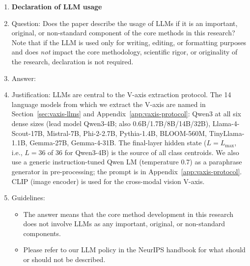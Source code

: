 \begin{enumerate}
\item {\bf Declaration of LLM usage}
    \item[] Question: Does the paper describe the usage of LLMs if it is an important, original, or non-standard component of the core methods in this research? Note that if the LLM is used only for writing, editing, or formatting purposes and does \emph{not} impact the core methodology, scientific rigor, or originality of the research, declaration is not required.
    \item[] Answer: \answerYes{}
    \item[] Justification: LLMs are central to the V-axis extraction protocol. The 14 language models from which we extract the V-axis are named in Section~\ref{sec:vaxis-llms} and Appendix~\ref{app:vaxis-protocol}: Qwen3 at all six dense sizes (lead model Qwen3-4B; also 0.6B/1.7B/8B/14B/32B), Llama-4-Scout-17B, Mistral-7B, Phi-2-2.7B, Pythia-1.4B, BLOOM-560M, TinyLlama-1.1B, Gemma-27B, Gemma-4-31B. The final-layer hidden state ($L = L_{\max}$, i.e., $L = 36$ of $36$ for Qwen3-4B) is the source of all class centroids. We also use a generic instruction-tuned Qwen LM (temperature 0.7) as a paraphrase generator in pre-processing; the prompt is in Appendix~\ref{app:vaxis-protocol}. CLIP \citep{radford2021clip} (image encoder) is used for the cross-modal vision V-axis.
    \item[] Guidelines:
    \begin{itemize}
        \item The answer \answerNA{} means that the core method development in this research does not involve LLMs as any important, original, or non-standard components.
        \item Please refer to our LLM policy in the NeurIPS handbook for what should or should not be described.
    \end{itemize}

\end{enumerate}
